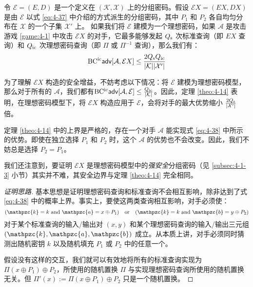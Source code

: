 \begin{theorem}\label{theo:4-14}
令 $\mathcal{E}=(E,D)$ 是一个定义在 $(\mathcal{K},\mathcal{X})$ 上的分组密码。假设 $\mathcal{E}X=(EX,DX)$ 是由 $\mathcal{E}$ 以式 \ref{eq:4-37} 中介绍的方式派生的分组密码，其中 $P_1$ 和 $P_2$ 各自均匀分布在 $\mathcal{X}$ 的一个子集 $\mathcal{X}'$ 上。 如果我们将 $\mathcal{E}$ 建模为一个理想密码，如果 $\mathcal{A}$ 是攻击游戏 \ref{game:4-1} 中攻击 $\mathcal{E}X$ 的对手，它最多能够发起 $Q_{\rm s}$ 次标准查询（即 $EX$ 查询）和 $Q_{\rm ic}$ 次理想密码查询（即 $\Pi$ 或 $\Pi^{-1}$ 查询），那么我们有：
\begin{equation}\label{eq:4-38}
{\rm BC^{ic}\mathsf{adv}}[\mathcal{A},\mathcal{E}X]\leq\frac{2Q_{\rm s}Q_{\rm ic}}{|\mathcal{K}||\mathcal{X}'|}
\end{equation}
\end{theorem}
\noindent
为了理解 $\mathcal{E}X$ 构造的安全增益，不妨考虑以下情况：将 $\mathcal{E}$ 建模为理想密码模型，那么对于所有的 $\mathcal{A}$，我们都有${\rm BC^{ic}\mathsf{adv}}[\mathcal{A},\mathcal{E}]\leq\frac{Q_{\rm ic}}{|\mathcal{K}|}$。因此，定理 \ref{theo:4-14} 表明，在理想密码模型下，将 $\mathcal{E}X$ 构造应用于 $\mathcal{E}$，会将对手的最大优势缩小 $\frac{2Q_{\rm s}}{|\mathcal{X}'|}$ 倍。

定理 \ref{theo:4-14} 中的上界是严格的，存在一个对手 $\mathcal{A}$ 能实现式 \ref{eq:4-38} 中所示的优势。即使在独立选择 $P_1$ 和 $P_2$ 时，这个 $\mathcal{A}$ 的优势也不会改变。因此，我们不妨总是选择 $P_2=P_1$。

我们还注意到，要证明 $\mathcal{E}X$ 是理想密码模型中的\emph{强安全}分组密码（见 \ref{subsec:4-1-3} 小节）其实并不难，其安全边界与定理 \ref{theo:4-14} 完全相同。

\begin{proof}[证明思路]
基本思想是证明理想密码查询和标准查询不会相互影响，除非达到了式 \ref{eq:4-38} 中的概率上界。事实上，要使这两类查询相互影响，对手必须使：
\[
(\mathpzc{k}=k~{\rm and}~\mathpzc{a}=x\oplus P_1)
\quad\text{or}\quad
(\mathpzc{k}=k~{\rm and}~\mathpzc{b}=y\oplus P_2)
\]
对于某个标准查询的输入/输出对 $(x,y)$ 和某个理想密码查询的输入/输出三元组 $(\mathpzc{k},\mathpzc{a},\mathpzc{b})$ 成立。从本质上讲，对手必须同时猜测出随机密钥 $k$ 以及随机填充 $P_1$ 或 $P_2$ 中的任意一个。

假设没有这样的交互，我们就可以有效地将所有的标准查询实现为 $\Pi(x\oplus P_1)\oplus P_2$，所使用的随机置换 $\Pi$ 与实现理想密码查询所使用的随机置换无关。但 $\Pi'(x):=\Pi(x\oplus P_1)\oplus P_2$ 只是一个随机置换。
\end{proof}

